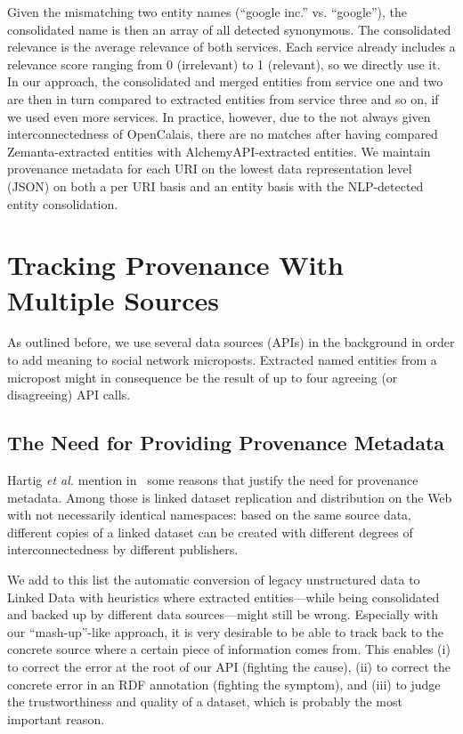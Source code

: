 \documentclass[twocolumn]{article}
\begin{document}
{Given the mismatching two entity names (``google inc.'' vs. ``google''), the consolidated name is then an array of all
detected synonymous. The consolidated relevance is the average relevance of both services. Each service already includes a relevance score ranging from
0 (irrelevant) to 1 (relevant), so we directly use it. In our approach, the consolidated and merged entities from
service one and two are then in turn compared to extracted entities from service three and so on, if we used even more
services. In practice, however, due to the not always given interconnectedness of OpenCalais, there are no matches
after having compared Zemanta-extracted entities with AlchemyAPI-extracted entities. We maintain provenance metadata for each URI on the lowest data representation level (JSON)
on both a per URI basis and an entity basis with the NLP-detected entity consolidation.

\vspace{2em}

\section{Tracking Provenance With Multiple Sources}                    \label{sec:tracking}
As outlined before, we use several data sources (APIs) in the background in order to add meaning to social network microposts. Extracted named entities from a micropost might in consequence be the result of up to four agreeing (or disagreeing) API calls. 

\subsection{The Need for Providing Provenance Metadata}
Hartig \emph{et al.} mention in~\cite{ipaw10:olaf} some reasons that justify the need for provenance metadata. Among those is linked dataset replication and distribution on the Web with not necessarily identical namespaces: based on the same source data, different copies of a linked dataset can be created with different degrees of interconnectedness by different publishers.

We add to this list the automatic conversion of legacy unstructured data to Linked Data with heuristics where extracted entities---while being consolidated and backed up by different data sources---might still be wrong. Especially with our ``mash-up''-like approach, it is very desirable to be able to track back to the concrete source where a certain piece of information comes from. This enables (i) to correct the error at the root of our API (fighting the cause), (ii) to correct the concrete error in an RDF annotation (fighting the symptom), and (iii) to judge the trustworthiness and quality of a dataset, which is probably the most important reason.

}
\end{document}
